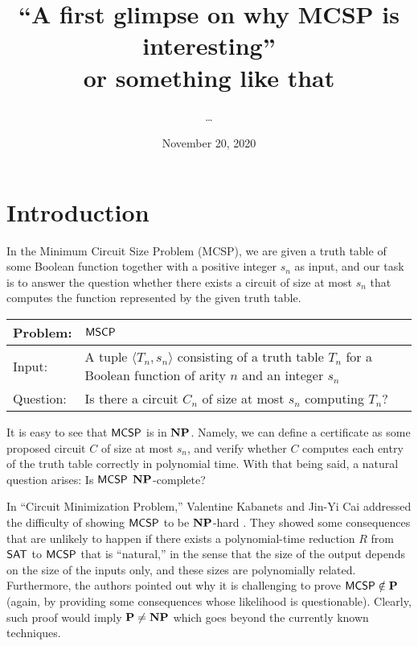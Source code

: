 \documentclass[11pt]{article}
\author{\dots}
\title{``A first glimpse on why MCSP is interesting''\\ or something like that}
\date{November 20, 2020}
\begin{document}
	\maketitle
	
\section{Introduction}

In the Minimum Circuit Size Problem (MCSP), we are given a truth table of some Boolean function together with a positive integer $s_n$ as input, and our task is to answer the question whether there exists a circuit of size at most $s_n$ that computes the function represented by the given truth table.

{
	\renewcommand{\arraystretch}{1.5}
	\begin{center}
		\begin{tabular}{|p{2cm}p{11cm}|}
			\hline
			Problem:
			&
			$\mathsf{MSCP}$
			\\
			\hline
			Input:
			&
			A tuple $\langle T_n, s_n \rangle$ consisting of a truth table $T_n$ for
			a Boolean function of arity $n$ and an integer $s_n$
			\\
			Question: & Is there a circuit $C_n$ of size at most $s_n$ computing $T_n$?
			\\
			\hline
		\end{tabular}
	\end{center}
}

It is easy to see that $\mathsf{MCSP}$ is in $\mathbf{NP}$. Namely, we can define a certificate as some proposed circuit $C$ of size at most $s_n$, and verify whether $C$ computes each entry of the truth table correctly in polynomial time. With that being said, a natural question arises: Is $\mathsf{MCSP}$  $\mathbf{NP}$-complete?

In ``Circuit Minimization Problem,'' Valentine Kabanets and Jin-Yi Cai addressed the difficulty of showing $\mathsf{MCSP}$ to be $\mathbf{NP}$-hard \cite{10.1145/335305.335314}. They showed some consequences that are unlikely to happen if there exists a polynomial-time reduction $R$ from $\mathsf{SAT}$ to $\mathsf{MCSP}$ that is ``natural,'' in the sense that the size of the output depends on the size of the inputs only, and these sizes are polynomially related.  Furthermore, the authors pointed out why it is challenging to prove $\mathsf{MCSP} \notin \mathbf{P}$ (again, by providing some consequences whose likelihood is questionable). Clearly, such proof would imply $\mathbf{P} \neq \mathbf{NP}$ which goes beyond the currently known techniques. 
\end{document}

